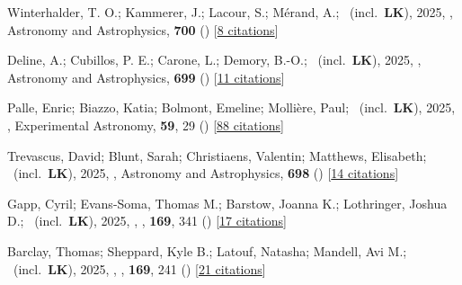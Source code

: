 \item[{\color{numcolor}\scriptsize141}] Winterhalder, T. O.; Kammerer, J.; Lacour, S.; M{\'e}rand, A.; \etal\ (incl.\ \textbf{LK}), 2025, , Astronomy and Astrophysics, \textbf{700} () [\href{https://ui.adsabs.harvard.edu/abs/2025A&A...700A...4W}{8 citations}]

\item[{\color{numcolor}\scriptsize140}] Deline, A.; Cubillos, P. E.; Carone, L.; Demory, B.-O.; \etal\ (incl.\ \textbf{LK}), 2025, , Astronomy and Astrophysics, \textbf{699} () [\href{https://ui.adsabs.harvard.edu/abs/2025A&A...699A.150D}{11 citations}]

\item[{\color{numcolor}\scriptsize139}] Palle, Enric; Biazzo, Katia; Bolmont, Emeline; Molli{\`e}re, Paul; \etal\ (incl.\ \textbf{LK}), 2025, , Experimental Astronomy, \textbf{59}, 29 () [\href{https://ui.adsabs.harvard.edu/abs/2025ExA....59...29P}{88 citations}]

\item[{\color{numcolor}\scriptsize138}] Trevascus, David; Blunt, Sarah; Christiaens, Valentin; Matthews, Elisabeth; \etal\ (incl.\ \textbf{LK}), 2025, , Astronomy and Astrophysics, \textbf{698} () [\href{https://ui.adsabs.harvard.edu/abs/2025A&A...698A..19T}{14 citations}]

\item[{\color{numcolor}\scriptsize137}] Gapp, Cyril; Evans-Soma, Thomas M.; Barstow, Joanna K.; Lothringer, Joshua D.; \etal\ (incl.\ \textbf{LK}), 2025, , \aj, \textbf{169}, 341 () [\href{https://ui.adsabs.harvard.edu/abs/2025AJ....169..341G}{17 citations}]

\item[{\color{numcolor}\scriptsize136}] Barclay, Thomas; Sheppard, Kyle B.; Latouf, Natasha; Mandell, Avi M.; \etal\ (incl.\ \textbf{LK}), 2025, , \aj, \textbf{169}, 241 () [\href{https://ui.adsabs.harvard.edu/abs/2025AJ....169..241B}{21 citations}]

